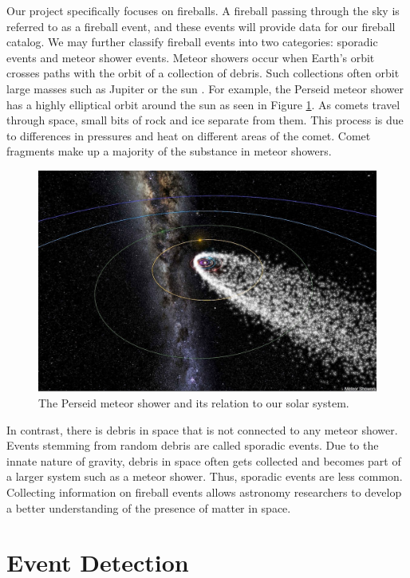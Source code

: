 Our project specifically focuses on fireballs.
A fireball passing through the sky is referred to as a fireball event, and these events will provide data for our fireball catalog.
We may further classify fireball events into two categories: sporadic events and meteor shower events.
Meteor showers occur when Earth's orbit crosses paths with the orbit of a collection of debris. 
Such collections often orbit large masses such as Jupiter or the sun \cite{trigo-rodriguez_2006_2007}.  
For example, the Perseid meteor shower has a highly elliptical orbit around the sun as seen in Figure \ref{perceid}.  
As comets travel through space, small bits of rock and ice separate from them.
This process is due to differences in pressures and heat on different areas of the comet.
Comet fragments make up a majority of the substance in meteor showers.

\begin{figure}[ht!]
  \centering
  \includegraphics[scale=0.7]{images/persiod_shower.jpg}
  \caption{The Perseid meteor shower and its relation to our solar system.}
  \label{perceid}
\end{figure}

In contrast, there is debris in space that is not connected to any meteor shower. 
Events stemming from random debris are called sporadic events.
Due to the innate nature of gravity, debris in space often gets collected and becomes part of a larger system such as a meteor shower.
Thus, sporadic events are less common.
Collecting information on fireball events allows astronomy researchers to develop a better understanding of the presence of matter in space. %


\section{Event Detection}

